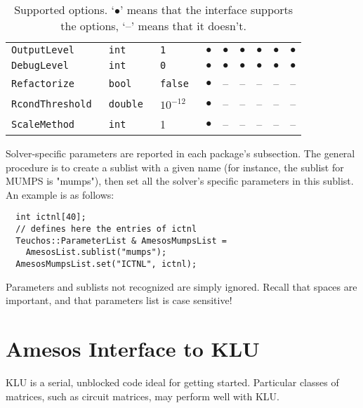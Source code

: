 \documentclass[11pt]{SANDreport}
\begin{document}
\begin{sidewaystable}[tbhp]
\begin{tabular}{| p{5cm} | p{2cm} | p{2cm} | c | c | c
      | c | c | c |}
    \tt OutputLevel         & \tt int    & \tt 1      & $\bullet$ & $\bullet$ & $\bullet$ & $\bullet$ & $\bullet$  & $\bullet$\\
    \tt DebugLevel          & \tt int    & \tt 0      & $\bullet$ & $\bullet$ & $\bullet$ & $\bullet$ & $\bullet$ & $\bullet$ \\
    \tt Refactorize         & \tt bool   & \tt false  & $\bullet$ & -- & -- & -- & -- & -- \\
    \tt RcondThreshold      & \tt double & $10^{-12}$ & $\bullet$ & -- & -- & -- & -- &--\\
    \tt ScaleMethod         & \tt int    & 1          & $\bullet$ & -- & -- & -- & -- &--\\
    \hline
  \end{tabular}
  \caption{Supported options. `$\bullet$' means that the interface
    supports the options, `--' means that it doesn't.}
  \label{tab:options}
\end{sidewaystable}

Solver-specific parameters are reported in each package's subsection.
The general procedure is to create a sublist with a given name (for
instance, the sublist for MUMPS is "mumps"), then set all the
solver's specific parameters in this sublist. An example is as follows:
\begin{verbatim}
  int ictnl[40];
  // defines here the entries of ictnl
  Teuchos::ParameterList & AmesosMumpsList = 
    AmesosList.sublist("mumps");
  AmesosMumpsList.set("ICTNL", ictnl);
\end{verbatim}
Parameters and sublists not recognized are simply ignored. Recall that
spaces are important, and that parameters list is case sensitive!

\section{Amesos Interface to KLU}
\label{sec:klu}

KLU is a serial, unblocked code ideal for getting started. Particular
classes of matrices, such as circuit matrices, may perform well with KLU.
\end{document}
